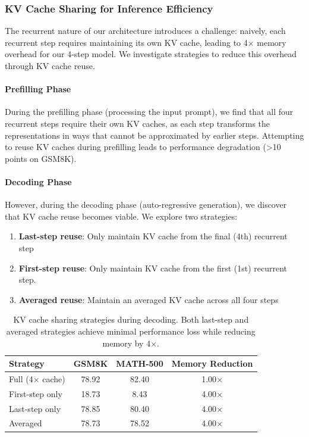\documentclass[]{bytedance_seed}
\newcommand{\1}{\mathbf{1}}
\begin{document}
\subsubsection{KV Cache Sharing for Inference Efficiency}

The recurrent nature of our architecture introduces a challenge: naively, each recurrent step requires maintaining its own KV cache, leading to 4$\times$ memory overhead for our 4-step model. We investigate strategies to reduce this overhead through KV cache reuse.

\paragraph{Prefilling Phase}
During the prefilling phase (processing the input prompt), we find that all four recurrent steps require their own KV caches, as each step transforms the representations in ways that cannot be approximated by earlier steps. Attempting to reuse KV caches during prefilling leads to performance degradation (>10 points on GSM8K).

\paragraph{Decoding Phase}
However, during the decoding phase (auto-regressive generation), we discover that KV cache reuse becomes viable. We explore two strategies:

\begin{enumerate}
    \item \textbf{Last-step reuse}: Only maintain KV cache from the final (4th) recurrent step
    \item   \textbf{First-step reuse}: Only maintain KV cache from the first (1st) recurrent step. 
    \item \textbf{Averaged reuse}: Maintain an averaged KV cache across all four steps
   
\end{enumerate}

\begin{table}[htbp]
\centering
\caption{KV cache sharing strategies during decoding. Both last-step and averaged strategies achieve minimal performance loss while reducing memory by 4$\times$.}
\label{tab:kv_cache}
\small
\begin{tabular}{@{}lccc@{}}
\toprule
\textbf{Strategy} & \textbf{GSM8K} & \textbf{MATH-500} & \textbf{Memory Reduction}  \\
\midrule
Full (4$\times$ cache) & 78.92 & 82.40 & 1.00$\times$  \\
First-step only & 18.73 & 8.43 & 4.00$\times$  \\
Last-step only & 78.85 & 80.40 & 4.00$\times$  \\
Averaged & 78.73 & 78.52 & 4.00$\times$ \\
\bottomrule
\end{tabular}
\end{table}
\end{document}
